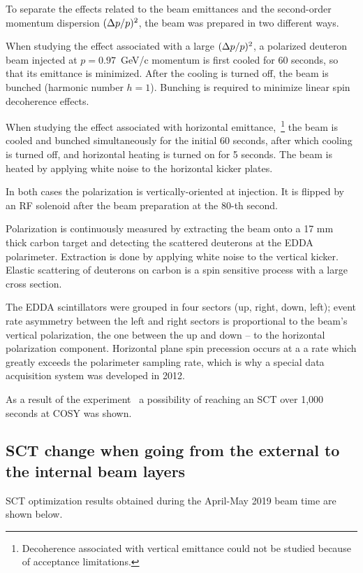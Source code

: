 To separate the effects related to the beam emittances and the 
second-order momentum dispersion $(\Delta p/p)^2$, the beam was prepared in two different ways.

When studying the effect associated with a large $(\Delta p/p)^2$, a polarized deuteron beam injected 
at $p=0.97$~GeV/c momentum is first cooled for 60 seconds, so that its emittance is minimized. 
After the cooling is turned off, the beam is bunched (harmonic number $h=1$). 
Bunching is required to minimize linear spin decoherence effects.

When studying the effect associated with horizontal emittance,~\footnote{Decoherence associated with 
	vertical emittance could not be studied because of acceptance limitations.} the beam is 
cooled and bunched simultaneously for the initial 60 seconds, after which cooling is turned off,
and horizontal heating is turned on for 5 seconds. The beam is heated by applying white noise to 
the horizontal kicker plates.

In both cases the polarization is vertically-oriented at injection. It is flipped by an RF solenoid 
after the beam preparation at the 80-th second.

Polarization is continuously measured by extracting the beam onto a 17 mm thick carbon target and
detecting the scattered deuterons at the EDDA polarimeter. 
Extraction is done by applying white noise to the vertical kicker. Elastic scattering of deuterons on 
carbon is a spin sensitive process with a large cross section.

The EDDA scintillators were grouped in four sectors (up, right, down, left); event rate asymmetry between the
left and right sectors is proportional to the beam's vertical polarization, the one between the up and down -- 
to the horizontal polarization component. Horizontal plane spin precession occurs at a a rate which greatly exceeds the polarimeter sampling rate, which is why a special data acquisition system was developed in 2012.~\cite{COSY:DAQ}

As a result of the experiment~\cite{Guidoboni:STORI14} a possibility of reaching an SCT over 1,000 seconds at COSY was shown. 

\subsection{SCT change when going from the external to the internal beam layers}
SCT optimization results obtained during the April-May 2019 beam time are shown below.

